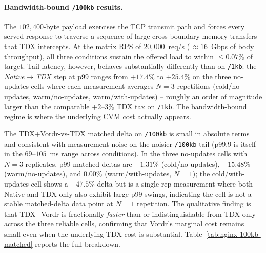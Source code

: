 \paragraph{Bandwidth-bound \texttt{/100kb} results.}
The $102{,}400$-byte payload exercises the TCP transmit path and
forces every served response to traverse a sequence of large
cross-boundary memory transfers that TDX intercepts. At the matrix
RPS of $20{,}000$~req/s (\,$\approx$$16$~Gbps of body throughput),
all three conditions sustain the offered load to within $\le 0.07\%$
of target. Tail latency, however, behaves substantially differently
than on \texttt{/1kb}: the
\emph{Native$\rightarrow$TDX} step at p99 ranges from $+17.4\%$ to
$+25.4\%$ on the three no-updates cells where each measurement averages
$N{=}3$ repetitions (cold/no-updates, warm/no-updates, warm/with-updates) --
roughly an order of magnitude larger than the comparable
$+2$--$3\%$ TDX tax on \texttt{/1kb}. The bandwidth-bound regime is
where the underlying CVM cost actually appears.

The TDX+Vordr-vs-TDX matched delta on \texttt{/100kb} is small in
absolute terms and consistent with measurement noise on the noisier
\texttt{/100kb} tail
(p99.9 is itself in the $69$--$105$~ms range across conditions). In
the three no-updates cells with $N{=}3$ replicates, p99 matched-deltas
are $-1.31\%$ (cold/no-updates), $-15.48\%$ (warm/no-updates), and $0.00\%$
(warm/with-updates, $N{=}1$); the cold/with-updates cell shows a
$-47.5\%$ delta but is a single-rep measurement where both Native
and TDX-only also exhibit large p99 swings, indicating the cell is
not a stable matched-delta data point at $N{=}1$ repetition. The
qualitative finding is that TDX+Vordr is fractionally
\emph{faster} than or indistinguishable from TDX-only across the
three reliable cells, confirming that Vordr's marginal cost remains
small even when the underlying TDX cost is substantial.
Table~\ref{tab:nginx-100kb-matched} reports the full breakdown.

